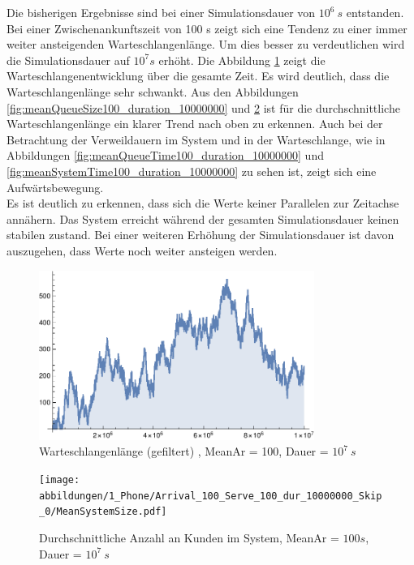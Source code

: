 Die bisherigen Ergebnisse sind bei einer Simulationsdauer von $10^6 \ s$ entstanden. Bei einer Zwischenankunftszeit von 100 s zeigt sich eine Tendenz zu einer immer weiter ansteigenden Warteschlangenlänge. Um dies besser zu verdeutlichen wird die Simulationsdauer auf $10^7 s$ erhöht. Die Abbildung \ref{fig:QueueStepPlotAll100_duration_10000000} zeigt die Warteschlangenentwicklung über die gesamte Zeit. Es wird deutlich, dass die Warteschlangenlänge sehr schwankt. Aus den Abbildungen \ref{fig:meanQueueSize100_duration_10000000} und \ref{fig:meanSystemSize100_duration_10000000} ist für die durchschnittliche Warteschlangenlänge ein klarer Trend nach oben zu erkennen. Auch bei der Betrachtung der Verweildauern im System und in der Warteschlange, wie in Abbildungen \ref{fig:meanQueueTime100_duration_10000000} und \ref{fig:meanSystemTime100_duration_10000000} zu sehen ist, zeigt sich eine Aufwärtsbewegung. \\
Es ist deutlich zu erkennen, dass sich die Werte keiner Parallelen zur Zeitachse annähern. Das System erreicht während der gesamten Simulationsdauer keinen stabilen zustand. Bei einer weiteren Erhöhung der Simulationsdauer ist davon auszugehen, dass Werte noch weiter ansteigen werden.

\begin{figure}[htpb]
	\centering
	\includegraphics[width=0.8\textwidth]{abbildungen/1_Phone/Arrival_100_Serve_100_dur_10000000_Skip_0/QueueStepPlotAllFiltered.pdf}
	\caption{Warteschlangenlänge (gefiltert) , MeanAr = 100, Dauer = $10^7 \ s$}
	\label{fig:QueueStepPlotAll100_duration_10000000}
\end{figure}


\begin{figure}[htpb]
	\centering
	\texttt{[image: abbildungen/1\_Phone/Arrival\_100\_Serve\_100\_dur\_10000000\_Skip\_0/MeanSystemSize.pdf]}
	\caption{Durchschnittliche Anzahl an Kunden im System, MeanAr = $100s$, Dauer = $10^7 \ s$}
	\label{fig:meanSystemSize100_duration_10000000}
\end{figure}


